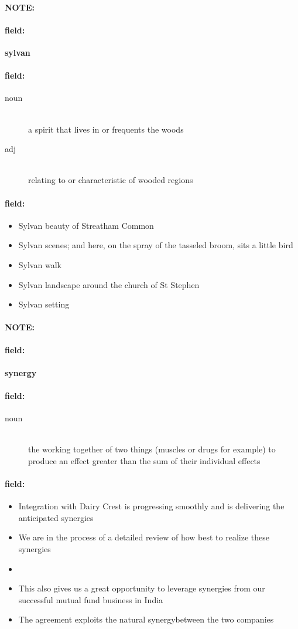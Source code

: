 \documentclass[12pt]{article}
\newenvironment{note}{\paragraph{NOTE:}}{}
\newenvironment{field}{\paragraph{field:}}{}
\begin{document}
\begin{note}
\begin{field}
\textbf{\large sylvan}
\end{field}


\begin{field}
\begin{description}
\item[noun] \hfill \\ 
a spirit that lives in or frequents the woods

\item[adj] \hfill \\ 
relating to or characteristic of wooded regions

\end{description}
\end{field}

\begin{field}
\begin{itemize}
\item Sylvan beauty of Streatham Common
\item Sylvan scenes; and here, on the spray of the tasseled broom, sits a little bird
\item Sylvan walk
\item Sylvan landscape around the church of St Stephen
\item Sylvan setting
\end{itemize}
\end{field}
\end{note}
\begin{note}
\begin{field}
\textbf{\large synergy}
\end{field}


\begin{field}
\begin{description}
\item[noun] \hfill \\ 
the working together of two things (muscles or drugs for example) to produce an effect greater than the sum of their individual effects

\end{description}
\end{field}

\begin{field}
\begin{itemize}
\item Integration with Dairy Crest is progressing smoothly and is delivering the anticipated synergies
\item We are in the process of a detailed review of how best to realize these synergies
\item 
\item This also gives us a great opportunity to leverage synergies from our successful mutual fund business in India
\item The agreement exploits the natural synergybetween the two companies
\end{itemize}
\end{field}
\end{note}
\end{document}
